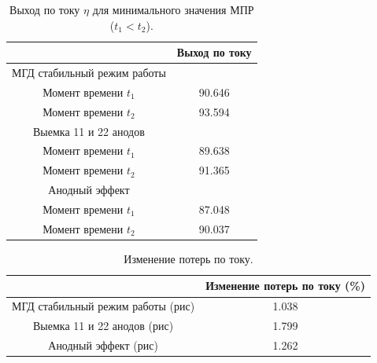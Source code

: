 \documentclass{article}
\begin{document}
\begin{table}[ht]
\centering
\begin{tabular}{|c|c|}
\hline
			&Выход по току	\\
\hline
МГД стабильный режим работы &	\\
Момент времени $t_1$			&90.646	\\ 
Момент времени $t_2$		&93.594	\\  
\hline
Выемка 11 и 22 анодов &	\\
Момент времени $t_1$		&89.638	\\  
Момент времени $t_2$		&91.365	\\  
\hline
Анодный эффект &	\\
Момент времени $t_1$	&87.048	\\  
Момент времени $t_2$	&90.037	\\  
\hline
\end{tabular}
\caption{Выход по току $\eta$ для минимального значения МПР ($t_1 < t_2$). \label{table:vichPoToku}}
\end{table}


\begin{table}[ht]
\centering
\begin{tabular}{|c|c|}
\hline
			& Изменение потерь по току (\%)\\
\hline
МГД стабильный режим работы (рис) & 1.038	\\
\hline
Выемка 11 и 22 анодов (рис) &	1.799\\
\hline
Анодный эффект (рис) & 1.262	\\
\hline
\end{tabular}
\caption{Изменение потерь по току. \label{table:ismineniep}}
\end{table}
\end{document}
